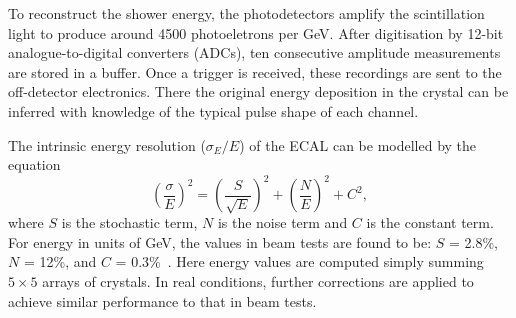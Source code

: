 To reconstruct the shower energy, the photodetectors amplify the scintillation light to produce around 4500 photoeletrons per GeV.
After digitisation by 12-bit analogue-to-digital converters (ADCs), ten consecutive amplitude measurements are stored in a buffer.
Once a trigger is received, these recordings are sent to the off-detector electronics. 
There the original energy deposition in the crystal can be inferred with knowledge of the typical pulse shape of each channel.

The intrinsic energy resolution ($\sigma_E/E$) of the ECAL can be modelled by the equation
\begin{equation}
  \left(\frac{\sigma}{E} \right)^{2} =  
  \left(\frac{S}{\sqrt{E}} \right)^{2} +  
  \left(\frac{N}{E} \right)^{2} +  
  C^{2},
\label{eq:detector_resolution}
\end{equation}
where $S$ is the stochastic term, $N$ is the noise term and $C$ is the constant term.
For energy in units of GeV, the values in beam tests are found to be: %
$S$ = 2.8\%, $N$ = 12\%, and $C$ = 0.3\%~\cite{CMSdetector}.
Here energy values are computed simply summing $5\times5$ arrays of crystals.
In real conditions, further corrections are applied to achieve similar performance to that in beam tests.

